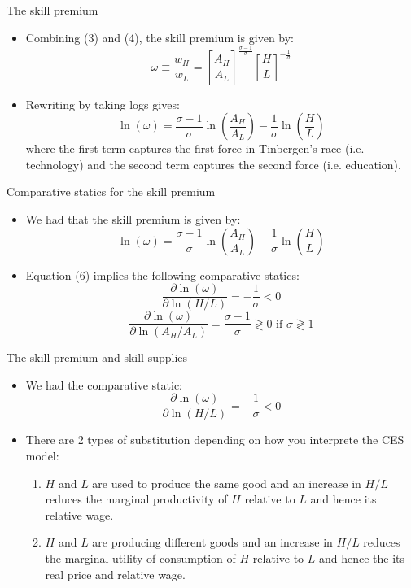 \documentclass[notes=show]{beamer}
\begin{document}
\begin{frame}{The skill premium}
\begin{itemize}
\item Combining (3) and (4), the skill premium is given by:
\[
\omega \equiv \frac{w_{H}}{w_{L}} = \left[ \frac{A_{H}}{A_{L}} \right] ^{ \frac{ \sigma -1}{ \sigma}}  \left[ \frac{H}{L} \right] ^ {-\frac{1}{ \sigma}} \tag{5} \label{eq5}
\]
\item Rewriting by taking logs gives:
\[
\ln( \omega ) = \frac{ \sigma - 1}{ \sigma} \ln \left( \frac{A_{H}}{A_{L}} \right) - \frac{1}{ \sigma} \ln \left( \frac{H}{L} \right)  
 \tag{6} \label{eq6}
\]
where the first term captures the first force in Tinbergen's race (i.e. technology) and the second term captures the second force (i.e. education).
\end{itemize}
\end{frame}

\begin{frame}{Comparative statics for the skill premium}
\begin{itemize}
\item We had that the skill premium is given by:
\[
\ln( \omega ) = \frac{ \sigma - 1}{ \sigma} \ln \left( \frac{A_{H}}{A_{L}} \right) - \frac{1}{ \sigma} \ln \left( \frac{H}{L} \right)  
 \tag{6} \label{eq6}
\]
\item Equation (6) implies the following comparative statics:
\[
\frac{\partial \ln( \omega )}{ \partial \ln(H/L)} = - \frac{1}{ \sigma} <0
 \tag{7} \label{eq7}
\]
\[
\frac{\partial \ln( \omega )}{ \partial \ln(A_{H}/A_{L})} = \frac{ \sigma - 1 }{ \sigma} \gtrless 0 \text{ if } \sigma \gtrless 1
 \tag{8} \label{eq8}
\]
\end{itemize}
\end{frame}

\begin{frame}{The skill premium and skill supplies}
\begin{itemize}
\item We had the comparative static:
\[
\frac{\partial \ln( \omega )}{ \partial \ln(H/L)} = - \frac{1}{ \sigma} <0
 \tag{7} \label{eq7}
\]
\item There are 2 types of substitution depending on how you interprete the CES model: \medskip
\begin{enumerate}
\item $H$ and $L$ are used to produce the same good and an increase in $H/L$ reduces the marginal productivity of  $H$ relative to $L$ and hence its relative wage.  \medskip
\item $H$ and $L$ are producing different goods and an increase in $H/L$ reduces the marginal utility of consumption of $H$ relative to $L$ and hence the its real price and relative wage.
\end{enumerate}
\end{itemize}
\end{frame}
\end{document}
